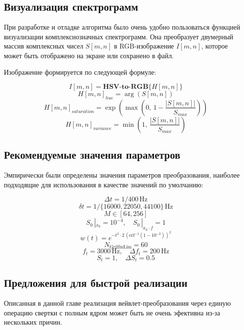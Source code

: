 \subsection{Визуализация спектрограмм}
При разработке и отладке алгоритма было очень удобно пользоваться функцией визуализации комплекснозначных спектрограмм.
Она преобразует двумерный массив комплексных чисел $S[m,n]$ в RGB-изображение $I[m,n]$, которое может быть отображено на экране или сохранено в файл.

Изображение формируется по следующей формуле:

\begin{equation}
  I[m,n] = \textbf{HSV-to-RGB}\{H[m,n]\}
\end{equation}
\[ H[m,n]_{hue} = \arg(S[m,n]) \]
\[ H[m,n]_{saturation} = \exp(\max(0,\, 1 - \frac{|S[m,n]|}{S_{max}})) \]
\[ H[m,n]_{variance} = \min(1,\, \frac{|S[m,n]|}{S_{max}}) \]


\subsection{Рекомендуемые значения параметров}

Эмпирически были определены значения параметров преобразования, наиболее подходящие для использования в качестве значений по умолчанию:

\begin{equation}
  \Delta t = 1 / 400 \, \mathrm{Hz}
\end{equation}
\[ \delta t = 1 / \{16000, 22050, 44100\} \, \mathrm{Hz} \]
\[ M \in [64, 256] \]
\[ S_0\,|_{x_0} = 10^{-4}, \quad S_0\,|_{x_0 \cdot f} = 1 \]
\[ w(t) = e^{-t^2 \cdot 2 \, (\mathrm{erf}^{-1}(1 - 10^{-2}))^2 } \]
\[ N_{\mathrm{GriffinLim}} = 60 \]
\[ f_t = 3000 \, \mathrm{Hz}, \quad \Delta f_t = 200 \, \mathrm{Hz} \]
\[ S_t = 1, \quad \Delta S_t = 0.5 \]


\subsection{Предложения для быстрой реализации}
Описанная в данной главе реализация вейвлет-преобразования через единую операцию свертки с полным ядром может быть не очень эфективна из-за нескольких причин.

